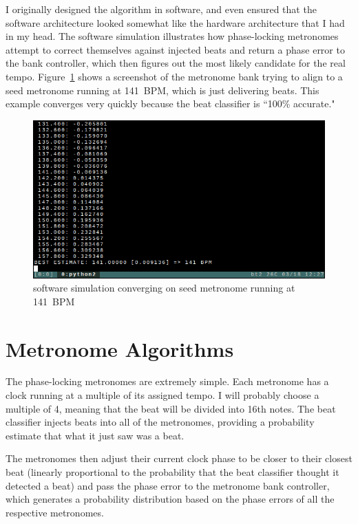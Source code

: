 \documentclass[letterpaper]{article}
\begin{document}
    I originally designed the algorithm in software, and even ensured that the
    software architecture looked somewhat like the hardware architecture that I
    had in my head.  The software simulation illustrates how phase-locking
    metronomes attempt to correct themselves against injected beats and return
    a phase error to the bank controller, which then figures out the most
    likely candidate for the real tempo.  Figure~\ref{fig:swscreenshot} shows a
    screenshot of the metronome bank trying to align to a seed metronome
    running at 141~BPM, which is just delivering beats.  This example converges
    very quickly because the beat classifier is ``100\% accurate."

    \begin{figure}
        \centering
        \includegraphics[scale=.5]{fig/swscreenshot.png}
        \caption{software simulation converging on seed metronome running at 141~BPM}
        \label{fig:swscreenshot}
    \end{figure}


\section{Metronome Algorithms}

    The phase-locking metronomes are extremely simple.  Each metronome has a
    clock running at a multiple of its assigned tempo.  I will probably choose
    a multiple of 4, meaning that the beat will be divided into 16th notes.
    The beat classifier injects beats into all of the metronomes, providing a
    probability estimate that what it just saw was a beat.

    The metronomes then adjust their current clock phase to be closer to their
    closest beat (linearly proportional to the probability that the beat
    classifier thought it detected a beat) and pass the phase error to the
    metronome bank controller, which generates a probability distribution based
    on the phase errors of all the respective metronomes.
\end{document}
